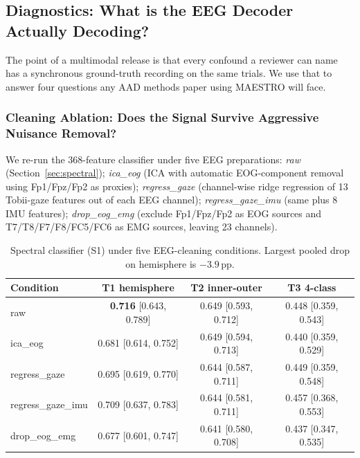 \documentclass{article}
\begin{document}
\subsection{Diagnostics: What is the EEG Decoder Actually Decoding?}
\label{app:diagnostics}

The point of a multimodal release is that every confound a reviewer can name
has a synchronous ground-truth recording on the same trials. We use that to
answer four questions any AAD methods paper using MAESTRO will face.

\subsubsection{Cleaning Ablation: Does the Signal Survive Aggressive Nuisance Removal?}
\label{app:cleaning}

We re-run the 368-feature classifier under five EEG preparations: \emph{raw}
(Section~\ref{sec:spectral}); \emph{ica\_eog} (ICA with automatic
EOG-component removal using Fp1/Fpz/Fp2 as proxies); \emph{regress\_gaze}
(channel-wise ridge regression of 13 Tobii-gaze features out of each EEG
channel); \emph{regress\_gaze\_imu} (same plus 8 IMU features);
\emph{drop\_eog\_emg} (exclude Fp1/Fpz/Fp2 as EOG sources and
T7/T8/F7/F8/FC5/FC6 as EMG sources, leaving 23 channels).

\begin{table}[ht]
\centering
\small
\caption{Spectral classifier (S1) under five EEG-cleaning conditions.
Largest pooled drop on hemisphere is $-3.9$\,pp.}
\label{tab:cleaning}
\begin{tabular}{lccc}
\toprule
Condition & T1 hemisphere & T2 inner-outer & T3 4-class \\
\midrule
raw                & \textbf{0.716} [0.643, 0.789] & 0.649 [0.593, 0.712] & 0.448 [0.359, 0.543] \\
ica\_eog           & 0.681 [0.614, 0.752]          & 0.649 [0.594, 0.713] & 0.440 [0.359, 0.529] \\
regress\_gaze      & 0.695 [0.619, 0.770]          & 0.644 [0.587, 0.711] & 0.449 [0.359, 0.548] \\
regress\_gaze\_imu & 0.709 [0.637, 0.783]          & 0.644 [0.581, 0.711] & 0.457 [0.368, 0.553] \\
drop\_eog\_emg     & 0.677 [0.601, 0.747]          & 0.641 [0.580, 0.708] & 0.437 [0.347, 0.535] \\
\bottomrule
\end{tabular}
\end{table}
\end{document}
